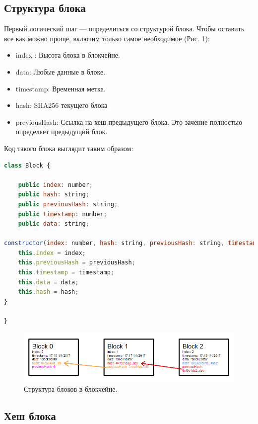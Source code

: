 \documentclass{article}
\begin{document}
\subsection{Структура блока}


Первый логический шаг — определиться со структурой блока. Чтобы оставить все как можно проще, включим только самое необходимое  (Рис. 1):


\begin{itemize}
\item index : Высота блока в блокчейне.
\item data: Любые данные в блоке.
\item timestamp: Временная метка.
\item hash: SHA256 текущего блока
\item previousHash: Ссылка на хеш предыдущего блока. Это зачение полностью определяет предыдущий блок.
\end{itemize}

Код такого блока выглядит таким образом:


\begin{lstlisting}[language=JavaScript, caption={Структура блока}]
class Block {

	public index: number;
	public hash: string;
	public previousHash: string;
	public timestamp: number;
	public data: string;

constructor(index: number, hash: string, previousHash: string, timestamp: number, data: string) {
	this.index = index;
	this.previousHash = previousHash;
	this.timestamp = timestamp;
	this.data = data;
	this.hash = hash;
}

}
\end{lstlisting}


\begin{figure}
	\centering
	\includegraphics[scale=0.45]{blockchain_scheme}
	\caption{Структура блоков в блокчейне.}
	\label{fig:blockchain_scheme}
\end{figure}

\subsection{Хеш блока}
\end{document}
